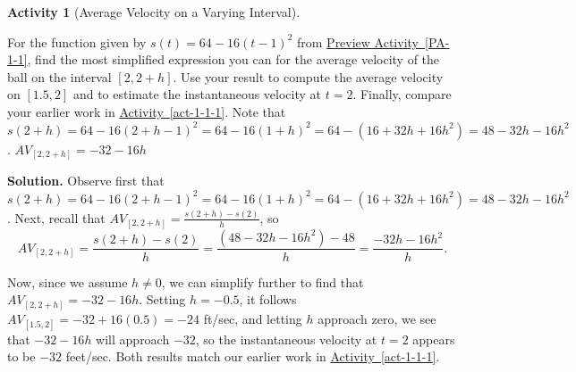 \documentclass[10pt,]{book}
\theoremstyle{plain}
\theoremstyle{definition}
\theoremstyle{definition}
\theoremstyle{definition}
\theoremstyle{definition}
\newtheorem{activity}[project]{Activity}
\theoremstyle{definition}
\numberwithin{equation}{section}
\begin{document}
  
%
\begin{activity}[Average Velocity on a Varying Interval]\label{act-1-1-3}

        For the function given by \(s(t) = 64 - 16(t-1)^2\) from \hyperref[PA-1-1]{Preview Activity~\ref{PA-1-1}}, find the most simplified expression you can for the average velocity of the ball on the interval \([2, 2+h]\). Use your result to compute the average velocity on \([1.5,2]\) and to estimate the instantaneous velocity at \(t = 2\). Finally, compare your earlier work in \hyperref[act-1-1-1]{Activity~\ref{act-1-1-1}}.
Note that \(s(2+h) = 64 - 16(2+h-1)^2 = 64 - 16(1+h)^2 = 64 - (16 + 32h + 16h^2) = 48 - 32h - 16h^2\).%
 \(AV_{[2, 2+h]} = -32 - 16h\) %
\par\medskip\noindent%
\textbf{Solution.}\quad 
          Observe first that \(s(2+h) = 64 - 16(2+h-1)^2 = 64 - 16(1+h)^2 = 64 - (16 + 32h + 16h^2) = 48 - 32h - 16h^2\). Next, recall that \(AV_{[2, 2+h]} = \frac{s(2+h) - s(2)}{h}\), so
\begin{equation*}
          AV_{[2, 2+h]} = \frac{s(2+h) - s(2)}{h} = \frac{(48 - 32h - 16h^2)-48}{h} = \frac{-32h - 16h^2}{h}.
          \end{equation*}\par

          Now, since we assume \(h \ne 0\), we can simplify further to find that \(AV_{[2, 2+h]} = -32 - 16h\). Setting \(h = -0.5\), it follows \(AV_{[1.5,2]} = -32 + 16(0.5) = -24\) ft/sec, and letting \(h\) approach zero, we see that \(-32 - 16h\) will approach \(-32\), so the instantaneous velocity at \(t = 2\) appears to be \(-32\) feet/sec. Both results match our earlier work in \hyperref[act-1-1-1]{Activity~\ref{act-1-1-1}}.
\end{activity}
\typeout{************************************************}
\typeout{************************************************}
\end{document}
